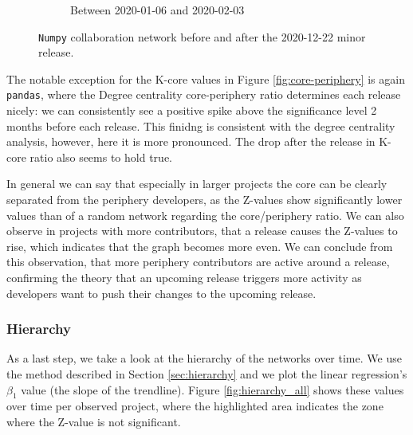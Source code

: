 \begin{figure}
\begin{subfigure}{0.49\textwidth}
        \caption{Between 2020-01-06 and 2020-02-03}
        \label{fig:numpy-after}
    \end{subfigure}
    \caption{\texttt{Numpy} collaboration network before and after the 2020-12-22 minor release.}
    \label{fig:core-periphery-numpy}
\end{figure}

The notable exception for the K-core values in Figure \ref{fig:core-periphery} is again \texttt{pandas}, where the Degree centrality core-periphery ratio determines each release nicely: we can consistently see a positive spike above the significance level 2 months before each release. This finidng is consistent with the degree centrality analysis, however, here it is more pronounced. The drop after the release in K-core ratio also seems to hold true.

In general we can say that especially in larger projects the core can be clearly separated from the periphery developers, as the Z-values show significantly lower values than of a random network regarding the core/periphery ratio. We can also observe in projects with more contributors, that a release causes the Z-values to rise, which indicates that the graph becomes more even. We can conclude from this observation, that more periphery contributors are active around a release, confirming the theory that an upcoming release triggers more activity as developers want to push their changes to the upcoming release.

\subsubsection{Hierarchy}

As a last step, we take a look at the hierarchy of the networks over time. We use the method described in Section \ref{sec:hierarchy} and we plot the linear regression's $\beta_1$ value (the slope of the trendline). Figure \ref{fig:hierarchy_all} shows these values over time per observed project, where the highlighted area indicates the zone where the Z-value is not significant.


